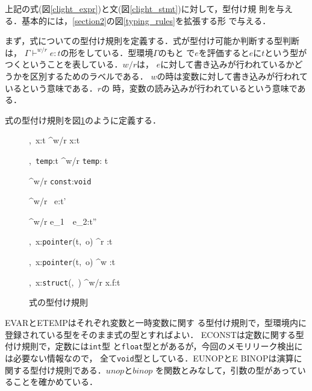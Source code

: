 上記の式(図\ref{clight_expr})と文(図\ref{clight_stmt})に対して，型付け規
則を与える．基本的には，\ref{section2}の図\ref{typing_rules}を拡張する形
で与える．

まず，式についての型付け規則を定義する．式が型付け可能か判断する型判断は，
$\Gamma \vdash^{w/r} e:t$の形をしている．型環境$\Gamma$のもと
で$e$を評価すると$e$に$t$という型がつくということを表している．$w/r$は，
$e$に対して書き込みが行われているかどうかを区別するためのラベルである．
$w$の時は変数に対して書き込みが行われているという意味である．$r$の
時，変数の読み込みが行われているという意味である．


\begin{definition}[式]
式の型付け規則を図\ref{typing_expr}のように定義する．
\end{definition}
\begin{figure}[htbp]
 \small
  \infrule[Evar]{
  }
  {
  \Gamma,\ x:t \vdash^{w/r} x:t
  }

  \infrule[Etemp]{
  }
  {
  \Gamma,\ \texttt{temp}:t \vdash^{w/r} \texttt{temp}: t
  }

  \infrule[Econst]{
  }
  {
  \Gamma \vdash^{w/r} \texttt{const}:\texttt{void}
  }


  {
  \Gamma \vdash^{w/r} \ e:t'
  }

  {
  \Gamma \vdash^{w/r} e_{1}\ \ e_{2}:t''
  }

  {
  \Gamma,\ x:\texttt{pointer}(t,\ o) \vdash^{r} :t
  }

  {
  \Gamma,\ x:\texttt{pointer}(t,\ o) \vdash^{w} :t
  }

  {
  \Gamma,\ x:\texttt{struct}(,\ ) \vdash^{w/r} x.f:t
  }
  \caption{式の型付け規則}
  \label{typing_expr}
\end{figure}

E{\footnotesize VAR}とE{\footnotesize TEMP}はそれぞれ変数と一時変数に関す
る型付け規則で，型環境内に登録されている型をそのまま式の型とすればよい．
E{\footnotesize CONST}は定数に関する型付け規則で，定数には\texttt{int}型
と\texttt{float}型とがあるが，今回のメモリリーク検出には必要ない情報なので，
全て\texttt{void}型としている．E{\footnotesize UNOP}とE{\footnotesize
BINOP}は演算に関する型付け規則である．$\mathit{unop}$と$\mathit{binop}$
を関数とみなして，引数の型があっていることを確かめている．

